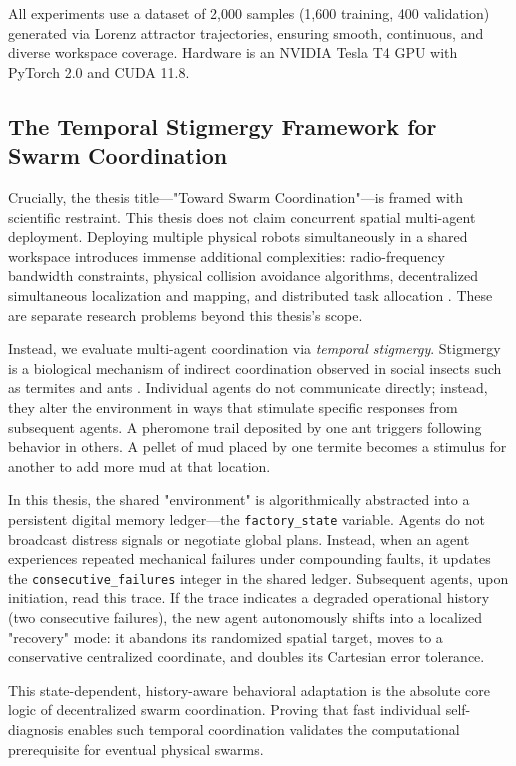 \documentclass[12pt,a4paper,oneside]{report}
\begin{document}
All experiments use a dataset of 2,000 samples (1,600 training, 400 validation) generated via Lorenz attractor trajectories, ensuring smooth, continuous, and diverse workspace coverage. Hardware is an NVIDIA Tesla T4 GPU with PyTorch 2.0 and CUDA 11.8.

\subsection{The Temporal Stigmergy Framework for Swarm Coordination}

Crucially, the thesis title—"Toward Swarm Coordination"—is framed with scientific restraint. This thesis does not claim concurrent spatial multi-agent deployment. Deploying multiple physical robots simultaneously in a shared workspace introduces immense additional complexities: radio-frequency bandwidth constraints, physical collision avoidance algorithms, decentralized simultaneous localization and mapping, and distributed task allocation \cite{matsuki2024gaussian, keetha2024splattam}. These are separate research problems beyond this thesis's scope.

Instead, we evaluate multi-agent coordination via \textit{temporal stigmergy}. Stigmergy is a biological mechanism of indirect coordination observed in social insects such as termites and ants \cite{bongard2006resilient}. Individual agents do not communicate directly; instead, they alter the environment in ways that stimulate specific responses from subsequent agents. A pheromone trail deposited by one ant triggers following behavior in others. A pellet of mud placed by one termite becomes a stimulus for another to add more mud at that location.

In this thesis, the shared "environment" is algorithmically abstracted into a persistent digital memory ledger—the \texttt{factory\_state} variable. Agents do not broadcast distress signals or negotiate global plans. Instead, when an agent experiences repeated mechanical failures under compounding faults, it updates the \texttt{consecutive\_failures} integer in the shared ledger. Subsequent agents, upon initiation, read this trace. If the trace indicates a degraded operational history (two consecutive failures), the new agent autonomously shifts into a localized "recovery" mode: it abandons its randomized spatial target, moves to a conservative centralized coordinate, and doubles its Cartesian error tolerance.

This state-dependent, history-aware behavioral adaptation is the absolute core logic of decentralized swarm coordination. Proving that fast individual self-diagnosis enables such temporal coordination validates the computational prerequisite for eventual physical swarms.
\end{document}
